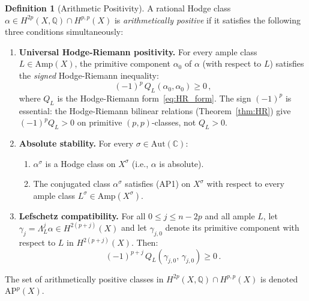\documentclass[aps,prd,twocolumn,superscriptaddress,nofootinbib]{revtex4-2}
\theoremstyle{definition}
\newtheorem{definition}[theorem]{Definition}
\theoremstyle{remark}
\begin{document}
\begin{definition}[Arithmetic Positivity]
\label{def:arith_pos}
A rational Hodge class $\alpha \in H^{2p}(X, \mathbb{Q}) \cap H^{p,p}(X)$ is \textit{arithmetically positive} if it satisfies the following three conditions simultaneously:

\begin{enumerate}
\item[\textbf{(AP1)}] \textbf{Universal Hodge-Riemann positivity.} For every ample class $L \in \mathrm{Amp}(X)$, the primitive component $\alpha_0$ of $\alpha$ (with respect to $L$) satisfies the \textit{signed} Hodge-Riemann inequality:
\begin{equation}
(-1)^p\, Q_L(\alpha_0, \alpha_0) \geq 0\,,
\label{eq:AP1}
\end{equation}
where $Q_L$ is the Hodge-Riemann form~\eqref{eq:HR_form}. The sign $(-1)^p$ is essential: the Hodge-Riemann bilinear relations (Theorem~\ref{thm:HR}) give $(-1)^p Q_L > 0$ on primitive $(p,p)$-classes, not $Q_L > 0$.

\item[\textbf{(AP2)}] \textbf{Absolute stability.} For every $\sigma \in \mathrm{Aut}(\mathbb{C})$:
\begin{enumerate}
\item[(a)] $\alpha^\sigma$ is a Hodge class on $X^\sigma$ (i.e., $\alpha$ is absolute).
\item[(b)] The conjugated class $\alpha^\sigma$ satisfies (AP1) on $X^\sigma$ with respect to every ample class $L^\sigma \in \mathrm{Amp}(X^\sigma)$.
\end{enumerate}

\item[\textbf{(AP3)}] \textbf{Lefschetz compatibility.} For all $0 \leq j \leq n - 2p$ and all ample $L$, let $\gamma_j = \Lambda_L^j \alpha \in H^{2(p+j)}(X)$ and let $\gamma_{j,0}$ denote its primitive component with respect to $L$ in $H^{2(p+j)}(X)$. Then:
\begin{equation}
(-1)^{p+j}\, Q_{L}(\gamma_{j,0},\, \gamma_{j,0}) \geq 0\,.
\label{eq:AP3}
\end{equation}
\end{enumerate}

The set of arithmetically positive classes in $H^{2p}(X, \mathbb{Q}) \cap H^{p,p}(X)$ is denoted $\mathrm{AP}^p(X)$.
\end{definition}
\end{document}

